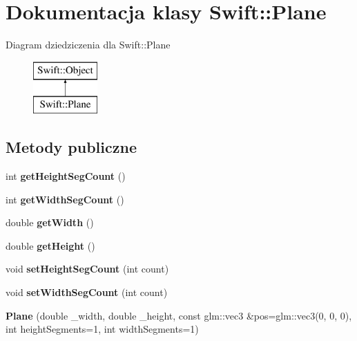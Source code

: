 \hypertarget{class_swift_1_1_plane}{\section{Dokumentacja klasy Swift\-:\-:Plane}
\label{class_swift_1_1_plane}
}
Diagram dziedziczenia dla Swift\-:\-:Plane\begin{figure}[H]
\begin{center}
\leavevmode
\includegraphics[height=2.000000cm]{class_swift_1_1_plane}
\end{center}
\end{figure}
\subsection*{Metody publiczne}
\begin{DoxyCompactItemize}
\item 
\hypertarget{class_swift_1_1_plane_a5f654ef9113bea684b53328caf120576}{int {\bfseries get\-Height\-Seg\-Count} ()}\label{class_swift_1_1_plane_a5f654ef9113bea684b53328caf120576}

\item 
\hypertarget{class_swift_1_1_plane_a4a2d32e4549496070fb86872c4b6d034}{int {\bfseries get\-Width\-Seg\-Count} ()}\label{class_swift_1_1_plane_a4a2d32e4549496070fb86872c4b6d034}

\item 
\hypertarget{class_swift_1_1_plane_a0b258151162b09301bea59bfaf595be7}{double {\bfseries get\-Width} ()}\label{class_swift_1_1_plane_a0b258151162b09301bea59bfaf595be7}

\item 
\hypertarget{class_swift_1_1_plane_a7fec527ad2fed8741b1fcc52df1431f4}{double {\bfseries get\-Height} ()}\label{class_swift_1_1_plane_a7fec527ad2fed8741b1fcc52df1431f4}

\item 
\hypertarget{class_swift_1_1_plane_acf9e20528202f5ddef83d392f9a49f6b}{void {\bfseries set\-Height\-Seg\-Count} (int count)}\label{class_swift_1_1_plane_acf9e20528202f5ddef83d392f9a49f6b}

\item 
\hypertarget{class_swift_1_1_plane_a06235c599ac0cf3b56d131906af9ecad}{void {\bfseries set\-Width\-Seg\-Count} (int count)}\label{class_swift_1_1_plane_a06235c599ac0cf3b56d131906af9ecad}

\item 
\hypertarget{class_swift_1_1_plane_a2adbe3c8324ccf6b248a5adb77f50b2f}{{\bfseries Plane} (double \-\_\-width, double \-\_\-height, const glm\-::vec3 \&pos=glm\-::vec3(0, 0, 0), int height\-Segments=1, int width\-Segments=1)}\label{class_swift_1_1_plane_a2adbe3c8324ccf6b248a5adb77f50b2f}

\end{DoxyCompactItemize}
